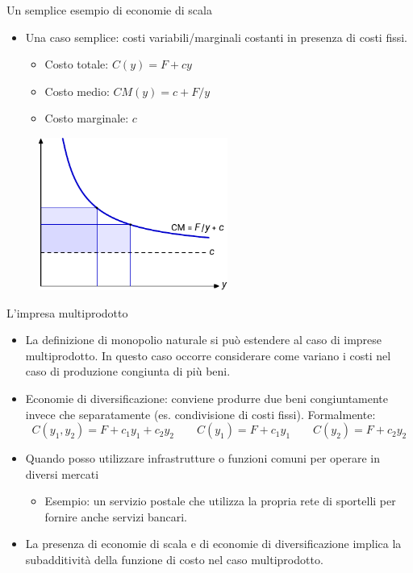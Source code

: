 \documentclass[aspectratio=64,12pt]{beamer}
\begin{document}
\begin{frame}{Un semplice esempio di economie di scala}
\begin{itemize}
\item Una caso semplice: costi variabili/marginali costanti in presenza di costi fissi.
\begin{itemize}
\item Costo totale: $C(y)=F+cy$
\item Costo medio: $CM(y)=c+F/y$
\item Costo marginale: $c$
\end{itemize}
\end{itemize}
\begin{figure}[htbp]
\centering
\includegraphics[height=5cm]{./figure/monopolio-naturale-1-color.pdf}
\end{figure}
\end{frame}


\begin{frame}{L'impresa multiprodotto}
\begin{itemize}
\item La definizione di monopolio naturale si può estendere al caso di imprese
multiprodotto. In questo caso occorre considerare come variano i costi nel
caso di produzione congiunta di più beni.
\item \alert{Economie di diversificazione}: conviene produrre due beni congiuntamente
invece che separatamente (es. condivisione di costi fissi). Formalmente:
\begin{equation*}
 C(y_1,y_2)=F + c_1y_1+c_2y_2 \qquad C(y_1)=F + c_1y_1 \qquad  C(y_2)=F + c_2y_2 
\end{equation*}
\item Quando posso utilizzare infrastrutture o funzioni comuni per operare in diversi mercati
\begin{itemize}
\item Esempio: un servizio postale che utilizza la propria rete di sportelli per
fornire anche servizi bancari.
\end{itemize}
\item La presenza di economie di scala e di economie di diversificazione implica
la subadditività della funzione di costo nel caso multiprodotto.
\end{itemize}
\end{frame}
\end{document}
